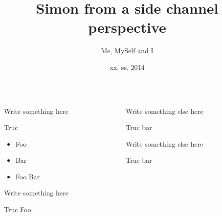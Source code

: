 \documentclass{beamer}
\title{Simon from a side channel perspective}
\author{Me, MySelf and I}
\date{xx. ss, 2014}
\begin{document}
\begin{frame}[t]

\begin{columns}
   \begin{column}{.45\textwidth}
      Write something here

      \begin{block}{Truc}
         \begin{itemize}
            \item Foo
            \item Bar
            \item Foo Bar
         \end{itemize}
      \end{block}

      \medskip
      Write something here

      \begin{block}{Truc}
         Foo
      \end{block}

   \end{column}
   \begin{column}{.45\textwidth}
      Write something else here

      \begin{block}{Truc}
         bar
      \end{block}

      \medskip
      Write something else here

      \begin{block}{Truc}
         bar
      \end{block}
   \end{column}

\end{columns}

\end{frame}
\end{document}
